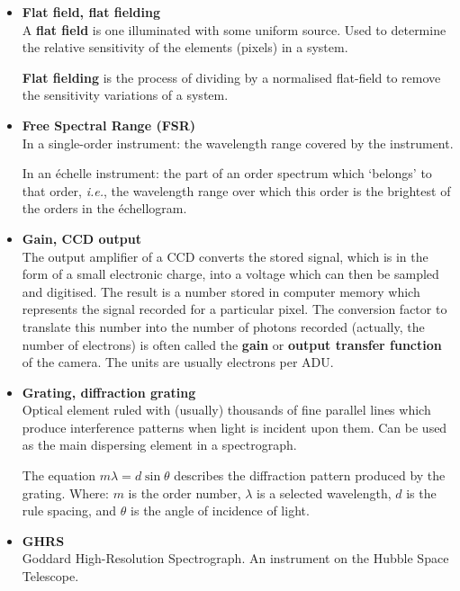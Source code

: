 \documentclass[twoside,11pt]{article}
\newcommand{\htmlref}[2]{#1}
\begin{document}
\begin{itemize}
\item {\bf\label{gl_flat_field}Flat field, flat fielding}\\
      A {\bf flat field} is one illuminated with some uniform source.
      Used to determine the relative sensitivity of the elements
      (pixels) in a system.

      {\bf Flat fielding} is the process of dividing by a normalised
      flat-field to remove the sensitivity variations of a system.

\item {\bf\label{gl_fsr}Free Spectral Range (FSR)}\\
      In a single-order instrument: the wavelength range covered by the
      instrument.

      In an \'{e}chelle instrument:  the part of an order spectrum which
      `belongs' to that order, {\it{i.e.}}, the wavelength range over
      which this order is the brightest of the orders in the
      \htmlref{\'{e}chellogram}{gl_echellogram}.

\item {\bf\label{gl_gain}Gain, CCD output}\\
      The output amplifier of a \htmlref{CCD}{gl_ccd} converts the stored
      signal, which is in the form of a small electronic charge, into
      a voltage which can then be sampled and digitised.  The result
      is a number stored in computer memory which represents the signal
      recorded for a particular pixel.  The conversion factor to
      translate this number into the number of photons recorded
      (actually, the number of electrons) is often called the {\bf gain}
      or {\bf output transfer function} of the camera.  The units are
      usually electrons per \htmlref{ADU}{gl_adu}\@.

\item {\bf\label{gl_grating}Grating, diffraction grating}\\
      Optical element ruled with (usually) thousands of fine parallel
      lines which produce interference patterns when light is incident
      upon them.  Can be used as the main dispersing element in a
      spectrograph.

      The equation $m\lambda = d\sin\theta$ describes the diffraction
      pattern produced by the grating.  Where: $m$ is the order number,
      $\lambda$ is a selected wavelength, $d$ is the rule spacing, and
      $\theta$ is the angle of incidence of light.

\item {\bf\label{gl_ghrs}GHRS}\\
      Goddard High-Resolution Spectrograph.  An instrument on the
      Hubble Space Telescope.


\end{itemize}
\end{document}
